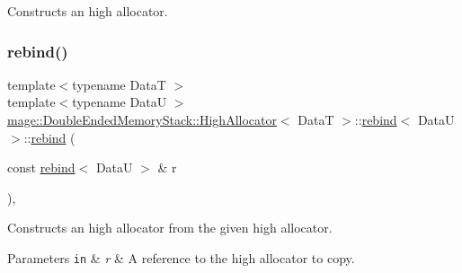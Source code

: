 Constructs an high allocator. \hypertarget{structmage_1_1_double_ended_memory_stack_1_1_high_allocator_1_1rebind_ae66cf8819a74c5c874b7e13df7ddd9f9}{}\label{structmage_1_1_double_ended_memory_stack_1_1_high_allocator_1_1rebind_ae66cf8819a74c5c874b7e13df7ddd9f9} 
\subsubsection{\texorpdfstring{rebind()}{rebind()}\hspace{0.1cm}{\footnotesize\ttfamily [2/3]}}
{\footnotesize\ttfamily template$<$typename DataT $>$ \\
template$<$typename DataU $>$ \\
\hyperlink{structmage_1_1_double_ended_memory_stack_1_1_high_allocator}{mage\+::\+Double\+Ended\+Memory\+Stack\+::\+High\+Allocator}$<$ DataT $>$\+::\hyperlink{structmage_1_1_double_ended_memory_stack_1_1_high_allocator_1_1rebind}{rebind}$<$ DataU $>$\+::\hyperlink{structmage_1_1_double_ended_memory_stack_1_1_high_allocator_1_1rebind}{rebind} (\begin{DoxyParamCaption}\item[{const \hyperlink{structmage_1_1_double_ended_memory_stack_1_1_high_allocator_1_1rebind}{rebind}$<$ DataU $>$ \&}]{r }\end{DoxyParamCaption})\hspace{0.3cm}{\ttfamily [private]}, {\ttfamily [delete]}}

Constructs an high allocator from the given high allocator.


\begin{DoxyParams}[1]{Parameters}
\mbox{\tt in}  & {\em r} & A reference to the high allocator to copy. \\
\hline
\end{DoxyParams}
\hypertarget{structmage_1_1_double_ended_memory_stack_1_1_high_allocator_1_1rebind_a282a02984b0c2600e66dee32f9839cf9}{}\label{structmage_1_1_double_ended_memory_stack_1_1_high_allocator_1_1rebind_a282a02984b0c2600e66dee32f9839cf9} 
